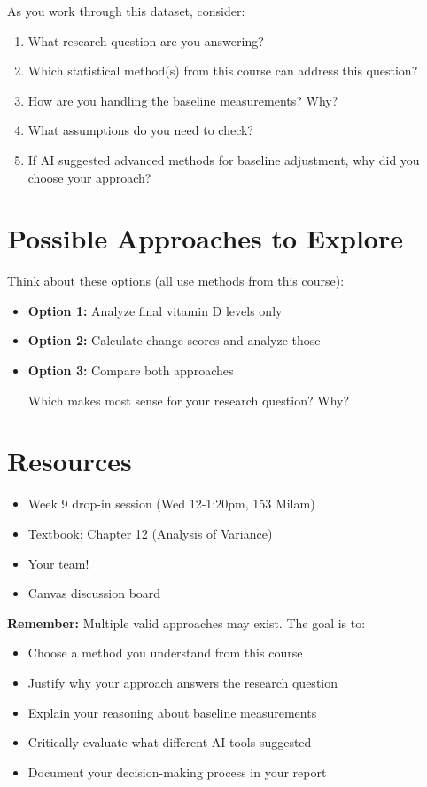 \documentclass[11pt]{article}
\begin{document}
As you work through this dataset, consider:

\begin{enumerate}
\item What research question are you answering?
\item Which statistical method(s) from this course can address this question?
\item How are you handling the baseline measurements? Why?
\item What assumptions do you need to check?
\item If AI suggested advanced methods for baseline adjustment, why did you choose your approach?
\end{enumerate}

\section*{Possible Approaches to Explore}

Think about these options (all use methods from this course):

\begin{itemize}
\item \textbf{Option 1:} Analyze final vitamin D levels only
\item \textbf{Option 2:} Calculate change scores and analyze those
\item \textbf{Option 3:} Compare both approaches

Which makes most sense for your research question? Why?
\end{itemize}

\section*{Resources}

\begin{itemize}
\item Week 9 drop-in session (Wed 12-1:20pm, 153 Milam)
\item Textbook: Chapter 12 (Analysis of Variance)
\item Your team!
\item Canvas discussion board
\end{itemize}

\vspace{0.5cm}

\begin{tcolorbox}[colback=gray!10,colframe=gray!50,boxrule=1pt,arc=2pt]
\textbf{Remember:} Multiple valid approaches may exist. The goal is to:
\begin{itemize}
\item Choose a method you understand from this course
\item Justify why your approach answers the research question
\item Explain your reasoning about baseline measurements
\item Critically evaluate what different AI tools suggested
\item Document your decision-making process in your report
\end{itemize}
\end{tcolorbox}
\end{document}
